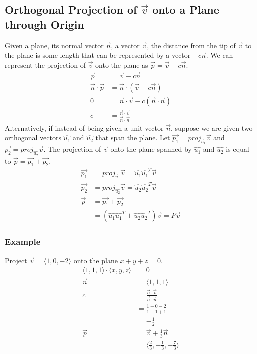 \documentclass{math}
\begin{document}
\subsection*{Orthogonal Projection of \( \vec{v} \) onto a Plane through Origin}
Given a plane, its normal vector \( \vec{n} \), a vector \( \vec{v} \), the
distance from the tip of \( \vec{v} \) to the plane is some length that can be
represented by a vector \( -c\vec{n} \). We can represent the projection of
\( \vec{v} \) onto the plane as \( \vec{p} = \vec{v}-c\vec{n} \).
\begin{align*}
  \vec{p} &= \vec{v}-c\vec{n} \\
  \vec{n}\cdot\vec{p} &= \vec{n}\cdot(\vec{v}-c\vec{n}) \\
  0 &= \vec{n}\cdot\vec{v}-c(\vec{n}\cdot\vec{n}) \\
  c &= \frac{\vec{n}\cdot\vec{v}}{\vec{n}\cdot\vec{n}}
\end{align*}
Alternatively, if instead of being given a unit vector \( \vec{n} \), suppose we
are given two orthogonal vectors \( \hat{u_1} \) and \( \hat{u_2} \) that span
the plane. Let \( \vec{p_1} = proj_{\hat{u_1}}\vec{v} \) and \( \vec{p_2} =
proj_{\hat{u_2}}\vec{v} \). The projection of \( \vec{v} \) onto the plane
spanned by \( \hat{u_1} \) and \( \hat{u_2} \) is equal to \( \vec{p} =
\vec{p_1}+\vec{p_2} \).
\begin{align*}
  \vec{p_1} &= proj_{\hat{u_1}}\vec{v} = \hat{u_1}\hat{u_1}^T\vec{v} \\
  \vec{p_2} &= proj_{\hat{u_2}}\vec{v} = \hat{u_2}\hat{u_2}^T\vec{v} \\
  \vec{p} &= \vec{p_1}+\vec{p_2} \\
  &= (\hat{u_1}\hat{u_1}^T+\hat{u_2}\hat{u_2}^T)\vec{v} = P\vec{v}
\end{align*}

\subsubsection*{Example}
Project \( \vec{v} = \langle1,0,-2\rangle \) onto the plane \( x+y+z = 0 \).
\begin{align*}
  \langle1,1,1\rangle\cdot\langle x,y,z\rangle &= 0 \\
  \vec{n} &= \langle1,1,1\rangle \\
  c &= \frac{\vec{n}\cdot\vec{v}}{\vec{n}\cdot\vec{n}} \\
  &= \frac{1+0-2}{1+1+1} \\
  &= -\frac{1}{2} \\
  \vec{p} &= \vec{v}+\frac{1}{3}\vec{n} \\
  &= \langle\frac{2}{3},-\frac{1}{3},-\frac{7}{3}\rangle
\end{align*}
\end{document}
